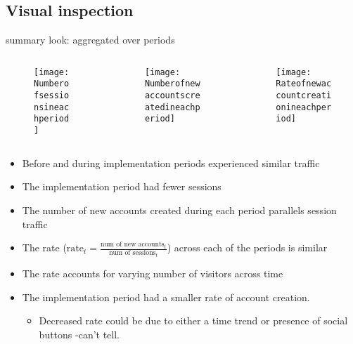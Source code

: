 \documentclass{beamer}
\begin{document}
		\subsection{Visual inspection}
		\begin{frame}{summary look: aggregated over periods}	
			\begin{columns}[onlytextwidth]
				\begin{column}{0.3\textwidth}
					\begin{figure}[H]
						\centering
						\texttt{[image: Numberofsessionsineachperiod]}
					\end{figure}
				\end{column}
				
				\begin{column}{.3\textwidth}
					\begin{figure}[H]
						\centering
						\texttt{[image: Numberofnewaccountscreatedineachperiod]}
					\end{figure}
				\end{column}
				
				\begin{column}{0.3\textwidth}
					\begin{figure}[H]
						\centering
						\texttt{[image: Rateofnewaccountcreationineachperiod]}
					\end{figure}
				\end{column}
			\end{columns}
		\end{frame}
		
		\begin{frame}
			\begin{itemize}
				\item Before and during implementation periods experienced similar traffic
				\item The implementation period had fewer sessions
				\item The number of new accounts created during each period parallels session traffic
				\item The rate ($\text{rate}_t = \frac{\text{num of new accounts}_t}{\text{num of sessions}_t}$) across each of the periods is similar
				\item The rate accounts for varying number of visitors across time
				\item The implementation period had a smaller rate of account creation.
					\begin{itemize}
					\item Decreased rate could be due to either a time trend or presence of social buttons -can't tell.
					\end{itemize}
			\end{itemize}
		\end{frame}
	
\end{document}
